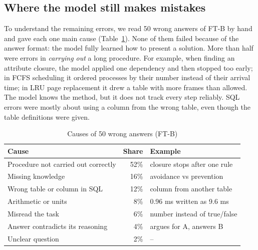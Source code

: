 \documentclass[conference]{IEEEtran}
\begin{document}
\noindent{}

\subsection{Where the model still makes mistakes}
To understand the remaining errors, we read 50 wrong answers of FT-B by hand and gave each one main cause (Table~\ref{tab:err}). None of them failed because of the answer format: the model fully learned how to present a solution. More than half were errors in \emph{carrying out} a long procedure. For example, when finding an attribute closure, the model applied one dependency and then stopped too early; in FCFS scheduling it ordered processes by their number instead of their arrival time; in LRU page replacement it drew a table with more frames than allowed. The model knows the method, but it does not track every step reliably. SQL errors were mostly about using a column from the wrong table, even though the table definitions were given.

\begin{table}[t]
\centering
\caption{Causes of 50 wrong answers (FT-B)}
\label{tab:err}
\begin{tabular}{@{}l r l@{}}
\toprule
Cause & Share & Example \\
\midrule
Procedure not carried out correctly & 52\% & closure stops after one rule \\
Missing knowledge & 16\% & avoidance vs prevention \\
Wrong table or column in SQL & 12\% & column from another table \\
Arithmetic or units & 8\% & 0.96 ms written as 9.6 ms \\
Misread the task & 6\% & number instead of true/false \\
Answer contradicts its reasoning & 4\% & argues for A, answers B \\
Unclear question & 2\% & -- \\
\bottomrule
\end{tabular}
\end{table}
\end{document}
